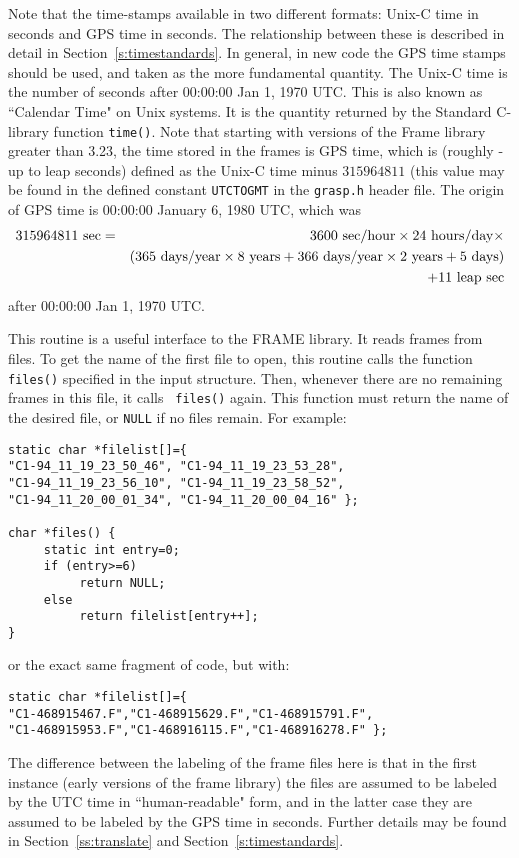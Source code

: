 Note that the time-stamps available in two different formats: Unix-C time in seconds 
and GPS time in seconds.  The relationship between these is described in detail in
Section~\ref{s:timestandards}.  In general, in new code the GPS time
stamps should be used, and taken as the more fundamental quantity.
The Unix-C time is the number of seconds after 00:00:00 Jan 1, 1970 UTC.
This is also known as
``Calendar Time" on Unix systems.  It is the quantity returned by the
Standard C-library function {\tt time()}.  Note that starting with
versions of the Frame library greater than 3.23, the time stored in the
frames is GPS time, which is (roughly - up to leap seconds) defined as the
Unix-C time minus $315964811$ (this value may be found
in the defined constant {\tt UTCTOGMT} in the {\tt grasp.h} header file.
The origin of GPS time is 00:00:00 January 6, 1980 UTC, which was
\begin{eqnarray*}
315964811 \ {\rm sec} &= & 3600 {\rm \ sec/hour} \times 24 {\rm \ hours/day} \times\\
& & (365 {\rm \ days/year} \times 8 {\rm \ years} + 366 {\rm \ days/year} \times 2 {\rm \ years}+ 5 {\rm \ days}) \\
& & + 11 {\rm\  leap\ sec}
\end{eqnarray*}
after 00:00:00 Jan 1, 1970 UTC.

This routine is a useful interface to the FRAME library.  It reads frames
from files.  To get the name of the first file to open, this routine
calls the function {\tt files()} specified in the input structure.
Then, whenever there are no remaining frames in this file, it calls {\tt
files()} again.  This function must return the name of the desired file,
or {\tt NULL} if no files remain.  For example:

\begin{verbatim}
static char *filelist[]={
"C1-94_11_19_23_50_46", "C1-94_11_19_23_53_28",
"C1-94_11_19_23_56_10", "C1-94_11_19_23_58_52",
"C1-94_11_20_00_01_34", "C1-94_11_20_00_04_16" };

char *files() {
     static int entry=0;
     if (entry>=6)
          return NULL;
     else
          return filelist[entry++];
}
\end{verbatim}
or the exact same fragment of code, but with:
\begin{verbatim}
static char *filelist[]={
"C1-468915467.F","C1-468915629.F","C1-468915791.F",
"C1-468915953.F","C1-468916115.F","C1-468916278.F" };
\end{verbatim}
The difference between the labeling of the frame files here is that
in the first instance (early versions of the frame library) the files
are assumed to be labeled by the UTC time in ``human-readable" form,
and in the latter case they are assumed to be labeled by the GPS time
in seconds.  Further details may be found in Section~\ref{ss:translate}
and Section~\ref{s:timestandards}.

